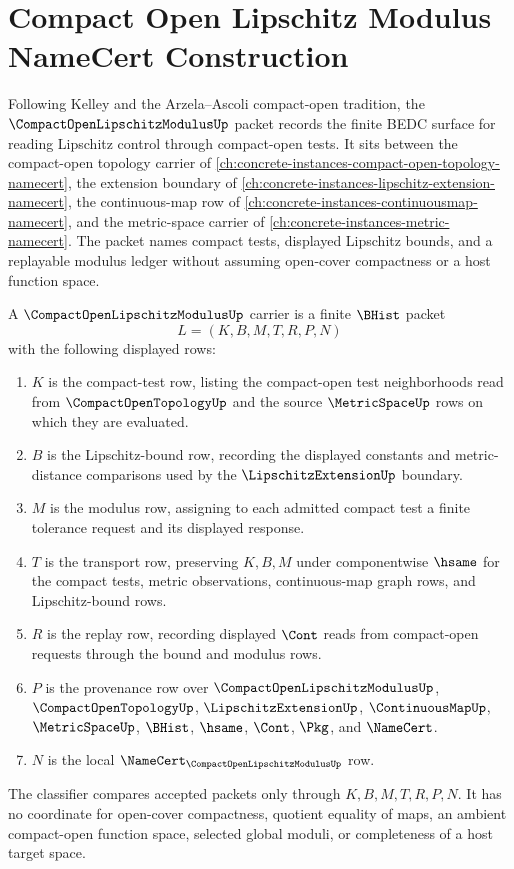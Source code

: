 \chapter{Compact Open Lipschitz Modulus NameCert Construction}
\label{ch:concrete-instances-compact-open-lipschitz-modulus-namecert}

Following Kelley and the Arzela--Ascoli compact-open tradition, the $\CompactOpenLipschitzModulusUp$ packet records the finite BEDC surface for reading Lipschitz control through compact-open tests. It sits between the compact-open topology carrier of \autoref{ch:concrete-instances-compact-open-topology-namecert}, the extension boundary of \autoref{ch:concrete-instances-lipschitz-extension-namecert}, the continuous-map row of \autoref{ch:concrete-instances-continuousmap-namecert}, and the metric-space carrier of \autoref{ch:concrete-instances-metric-namecert}. The packet names compact tests, displayed Lipschitz bounds, and a replayable modulus ledger without assuming open-cover compactness or a host function space.

\begin{definition}
\label{def:compact-open-lipschitz-modulus-carrier}
A $\CompactOpenLipschitzModulusUp$ carrier is a finite $\BHist$ packet
$$
L=(K,B,M,T,R,P,N)
$$
with the following displayed rows:
\begin{enumerate}
\item $K$ is the compact-test row, listing the compact-open test neighborhoods read from $\CompactOpenTopologyUp$ and the source $\MetricSpaceUp$ rows on which they are evaluated.
\item $B$ is the Lipschitz-bound row, recording the displayed constants and metric-distance comparisons used by the $\LipschitzExtensionUp$ boundary.
\item $M$ is the modulus row, assigning to each admitted compact test a finite tolerance request and its displayed response.
\item $T$ is the transport row, preserving $K,B,M$ under componentwise $\hsame$ for the compact tests, metric observations, continuous-map graph rows, and Lipschitz-bound rows.
\item $R$ is the replay row, recording displayed $\Cont$ reads from compact-open requests through the bound and modulus rows.
\item $P$ is the provenance row over $\CompactOpenLipschitzModulusUp$, $\CompactOpenTopologyUp$, $\LipschitzExtensionUp$, $\ContinuousMapUp$, $\MetricSpaceUp$, $\BHist$, $\hsame$, $\Cont$, $\Pkg$, and $\NameCert$.
\item $N$ is the local $\NameCert_{\CompactOpenLipschitzModulusUp}$ row.
\end{enumerate}
The classifier compares accepted packets only through $K,B,M,T,R,P,N$. It has no coordinate for open-cover compactness, quotient equality of maps, an ambient compact-open function space, selected global moduli, or completeness of a host target space.
\end{definition}

